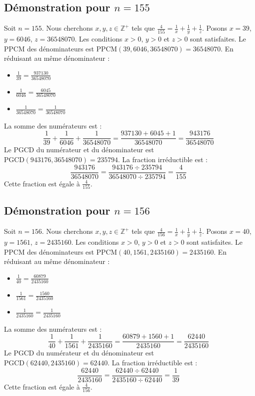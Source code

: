 \documentclass[11pt,a4paper]{article}
\begin{document}
\subsection{Démonstration pour $n = 155$}
Soit $n = 155$. Nous cherchons $x, y, z \in \mathbb{Z}^{+}$ tels que $\frac{4}{155} = \frac{1}{x} + \frac{1}{y} + \frac{1}{z}$.
Posons $x = 39$, $y = 6046$, $z = 36548070$.
Les conditions $x > 0$, $y > 0$ et $z > 0$ sont satisfaites.
Le PPCM des dénominateurs est $\text{PPCM}(39, 6046, 36548070) = 36548070$.
En réduisant au même dénominateur :
\begin{itemize}
    \item $\frac{1}{39} = \frac{937130}{36548070}$
    \item $\frac{1}{6046} = \frac{6045}{36548070}$
    \item $\frac{1}{36548070} = \frac{1}{36548070}$
\end{itemize}
La somme des numérateurs est :
$$ \frac{1}{39} + \frac{1}{6046} + \frac{1}{36548070} = \frac{937130 + 6045 + 1}{36548070} = \frac{943176}{36548070} $$
Le PGCD du numérateur et du dénominateur est $\text{PGCD}(943176, 36548070) = 235794$.
La fraction irréductible est :
$$ \frac{943176}{36548070} = \frac{943176 \div 235794}{36548070 \div 235794} = \frac{4}{155} $$
Cette fraction est égale à $\frac{4}{155}$.

\subsection{Démonstration pour $n = 156$}
Soit $n = 156$. Nous cherchons $x, y, z \in \mathbb{Z}^{+}$ tels que $\frac{4}{156} = \frac{1}{x} + \frac{1}{y} + \frac{1}{z}$.
Posons $x = 40$, $y = 1561$, $z = 2435160$.
Les conditions $x > 0$, $y > 0$ et $z > 0$ sont satisfaites.
Le PPCM des dénominateurs est $\text{PPCM}(40, 1561, 2435160) = 2435160$.
En réduisant au même dénominateur :
\begin{itemize}
    \item $\frac{1}{40} = \frac{60879}{2435160}$
    \item $\frac{1}{1561} = \frac{1560}{2435160}$
    \item $\frac{1}{2435160} = \frac{1}{2435160}$
\end{itemize}
La somme des numérateurs est :
$$ \frac{1}{40} + \frac{1}{1561} + \frac{1}{2435160} = \frac{60879 + 1560 + 1}{2435160} = \frac{62440}{2435160} $$
Le PGCD du numérateur et du dénominateur est $\text{PGCD}(62440, 2435160) = 62440$.
La fraction irréductible est :
$$ \frac{62440}{2435160} = \frac{62440 \div 62440}{2435160 \div 62440} = \frac{1}{39} $$
Cette fraction est égale à $\frac{4}{156}$.
\end{document}
